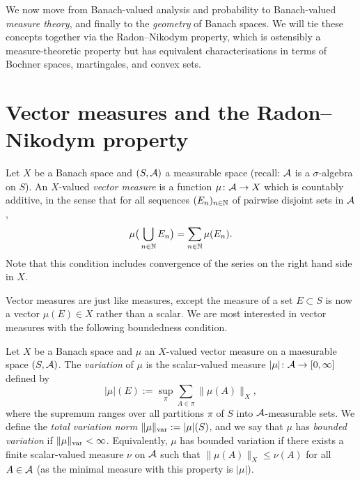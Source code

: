 We now move from Banach-valued analysis and probability to Banach-valued \emph{measure theory}, and finally to the \emph{geometry} of Banach spaces.
We will tie these concepts together via the Radon--Nikodym property, which is ostensibly a measure-theoretic property but has equivalent characterisations in terms of Bochner spaces, martingales, and convex sets.

\section{Vector measures and the Radon--Nikodym property}

\begin{defn}
  Let $X$ be a Banach space and $(S,\mathcal{A})$ a measurable space (recall: $\mathcal{A}$ is a $\sigma$-algebra on $S$).
  An $X$-valued \emph{vector measure} is a function $\mu \colon \mathcal{A} \rightarrow X$ which is countably additive, in the sense that for all sequences $(E_n)_{n \in \mathbb{N}}$ of pairwise disjoint sets in $\mathcal{A}$,
  \begin{equation*}
    \mu\big( \bigcup_{n \in \mathbb{N}} E_n \big) = \sum_{n \in \mathbb{N}} \mu(E_n).
  \end{equation*}
  Note that this condition includes convergence of the series on the right hand side in $X$.
\end{defn}

Vector measures are just like measures, except the measure of a set $E \subset S$ is now a vector $\mu(E) \in X$ rather than a scalar.
We are most interested in vector measures with the following boundedness condition.

\begin{defn}
  Let $X$ be a Banach space and $\mu$ an $X$-valued vector measure on a maesurable space $(S,\mathcal{A})$.
  The \emph{variation} of $\mu$ is the scalar-valued measure $|\mu| \colon \mathcal{A} \rightarrow [0,\infty]$ defined by
  \begin{equation*}
    |\mu|(E) := \sup_{\pi} \sum_{A \in \pi} \|\mu(A)\|_X,
  \end{equation*}
  where the supremum ranges over all partitions $\pi$ of $S$ into $\mathcal{A}$-measurable sets.
  We define the \emph{total variation norm} $\|\mu\|_{\mathrm{var}} := |\mu|(S)$, and we say that $\mu$ has \emph{bounded variation} if $\|\mu\|_{\mathrm{var}} < \infty$.
  Equivalently, $\mu$ has bounded variation if there exists a finite scalar-valued measure $\nu$ on $\mathcal{A}$ such that $\|\mu(A)\|_X \leq \nu(A)$ for all $A \in \mathcal{A}$ (as the minimal measure with this property is $|\mu|$).
\end{defn}

